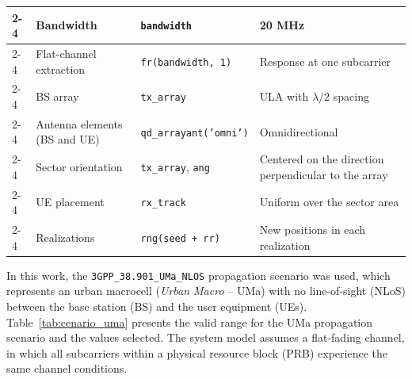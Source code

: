 \begin{table}[htbp]
\begin{tabular}{|p{2.5cm}|p{3.4cm}|p{4.2cm}|p{3.1cm}|}
\cline{2-4}
 & \raggedright Bandwidth & \raggedright \texttt{bandwidth} & \raggedright 20 MHz \tabularnewline
\cline{2-4}
 & \raggedright Flat-channel extraction & \raggedright \texttt{fr(bandwidth, 1)} & \raggedright Response at one subcarrier \tabularnewline
\cline{2-4}
 & \raggedright BS array & \raggedright \texttt{tx\_\allowbreak{}array} & \raggedright ULA with $\lambda/2$ spacing \tabularnewline
\cline{2-4}
 & \raggedright Antenna elements (BS and UE) & \raggedright \texttt{qd\_\allowbreak{}arrayant('omni')} & \raggedright Omnidirectional \tabularnewline
\cline{2-4}
 & \raggedright Sector orientation & \raggedright \texttt{tx\_\allowbreak{}array}, \texttt{ang} & \raggedright Centered on the direction perpendicular to the array \tabularnewline
\cline{2-4}
 & \raggedright UE placement & \raggedright \texttt{rx\_\allowbreak{}track} & \raggedright Uniform over the sector area \tabularnewline
\cline{2-4}
 & \raggedright Realizations & \raggedright \texttt{rng(seed + rr)} & \raggedright New positions in each realization \tabularnewline
\bottomrule
\end{tabular}
\vspace{4pt}
\end{table}


In this work, the \texttt{3GPP\_38.901\_UMa\_NLOS} propagation scenario was used, which represents an urban macrocell (\textit{Urban Macro} -- UMa) with no line-of-sight (NLoS) between the base station (BS) and the user equipment (UEs). Table~\ref{tab:cenario_uma} presents the valid range for the UMa propagation scenario and the values selected. The system model assumes a flat-fading channel, in which all subcarriers within a physical resource block (PRB) experience the same channel conditions.


